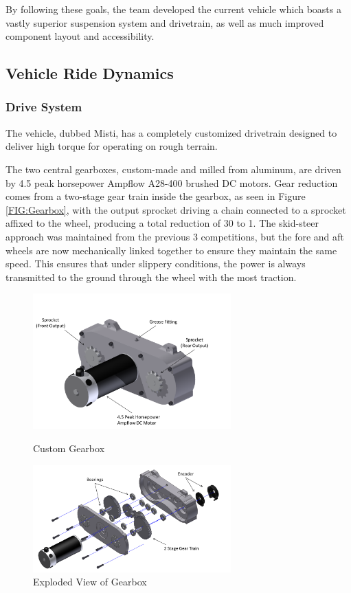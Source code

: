 By following these goals, the team developed the current vehicle which boasts a vastly superior suspension system and drivetrain, as well as much improved component layout and accessibility.

\subsection{Vehicle Ride Dynamics}
\subsubsection{Drive System}
The vehicle, dubbed Misti, has a completely customized drivetrain designed to deliver high torque for operating on rough terrain.

The two central gearboxes, custom-made and milled from aluminum, are driven by 4.5 peak horsepower Ampflow A28-400 brushed DC motors. Gear reduction comes from a two-stage gear train inside the gearbox, as seen in Figure \ref{FIG:Gearbox}, with the output sprocket driving a chain connected to a sprocket affixed to the wheel, producing a total reduction of 30 to 1. The skid-steer approach was maintained from the previous 3 competitions, but the fore and aft wheels are now mechanically linked together to ensure they maintain the same speed. This ensures that under slippery conditions, the power is always transmitted to the ground through the wheel with the most traction. 

\begin{figure}[H]
\begin{minipage}[b]{0.5\linewidth}
\centering
\includegraphics[width=3in]{./Pics/GearboxAssembled.png}
\caption{Custom Gearbox}
\label{FIG:Gearbox}
\end{minipage}
\hspace{0.1in}
\begin{minipage}[b]{0.5\linewidth}
\centering
\includegraphics[width=3in]{./Pics/GearboxExploded.png}
\caption{Exploded View of Gearbox}
\label{FIG:Explode}
\end{minipage}
\end{figure}


